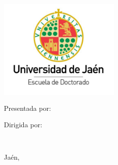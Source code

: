 \begin{center}
    \null\vspace{2mm}

    \includegraphics[width=0.45\textwidth]{images/Uja/UjaPhD.png}
    
    \vspace{5mm}
    
    {
        \libertineNormalCapital
        \LARGE

        \libertineNormalCapital
        \Huge 
        \textcolor{redThesis}{
        }
    }
    
    \vspace{55mm}

    \raggedleft
    {
       \libertineBoldCapital
       \Large 
       Presentada por:\\

       \vspace{2mm}
       
       \libertineNormalCapital
       \authorship
    }
    
    \vspace{5mm}

    \raggedleft
    {
       \libertineBoldCapital
       \Large 
       Dirigida por:\\

       \vspace{1mm}
    
       \libertineNormalCapital
       \mainSupervisor\\
       \minorSpacing
       \secondSupervisor
    }

    \vspace{6mm}

    \raggedleft
    {
        \libertineNormalCapital
        \Large 
        Jaén, \dateDissertationSpanish
    }
    
    \libertineNormal
    \newpage
\end{center}